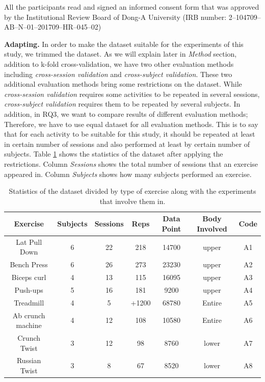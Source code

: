 \documentclass[journal,article,submit,moreauthors,pdftex]{Definitions/mdpi}
\begin{document}
All the participants read and signed an informed consent form that was approved by the Institutional Review Board of Dong-A University (IRB number: 2–104709–AB–N–01–201709–HR–045–02)

\noindent\textbf{Adapting.} In order to make the dataset suitable for the experiments of this study, we trimmed the dataset. As we will explain later in \textit{Method} section, addition to k-fold cross-validation, we have two other evaluation methods including \textit{cross-session validation} and \textit{cross-subject validation}. These two additional evaluation methods bring some restrictions on the dataset. While \textit{cross-session validation} requires some activities to be repeated in several sessions, \textit{cross-subject validation} requires them to be repeated by several subjects. In addition, in RQ3, we want to compare results of different evaluation methods; Therefore, we have to use equal dataset for all evaluation methods. This is to say that for each activity to be suitable for this study, it should be repeated at least in certain number of sessions and also performed at least by certain number of subjects.
Table \ref{dataset_statistics} shows the statistics of the dataset after applying the restrictions. Column \textit{Sessions} shows the total number of sessions that an exercise appeared in. Column \textit{Subjects} shows how many subjects performed an exercise.


\begin{table}[H]
	\caption{Statistics of the dataset divided by type of exercise along with the experiments that involve them in.}
	\centering
	\begin{tabular}{ccccc|cc}
		\toprule
		\textbf{Exercise} & \textbf{Subjects} & \textbf{Sessions}	 & \textbf{Reps} & \textbf{Data Point}& \textbf{Body Involved}	& \textbf{Code}  \\
		\midrule		
		Lat Pull Down& 6& 22& 218& 14700& upper 		& A1\\
		Bench Press	& 6& 26& 273& 23230& upper 			& A2\\
		Biceps curl	& 4& 13& 115& 16095& upper			& A3\\
		Push-ups & 5& 16& 181& 9200& upper			& A4\\
		Treadmill& 4& 5& +1200 & 68780& Entire 			& A5\\
		Ab crunch machine& 4& 12& 108 & 10580& Entire & A6\\
		Crunch Twist &  3& 12& 98& 8760& lower			& A7 \\
		Russian Twist & 3& 8& 67& 8520& lower			& A8\\
		\bottomrule
	\end{tabular}
	\label{dataset_statistics}
\end{table}
\end{document}
